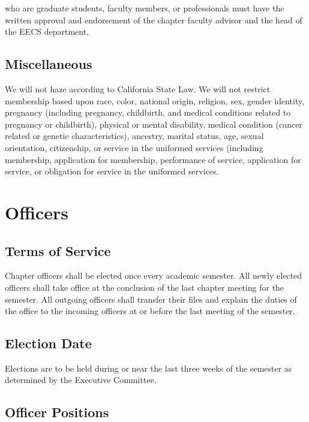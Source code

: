 \documentclass[11pt]{article}
\begin{document}
who are graduate students, faculty members, or professionals must have the written approval and endorsement of the chapter faculty advisor and the head of the EECS department.

\subsection{Miscellaneous}
\label{sec:orgf3400cb}

We will not haze according to California State Law.
We will not restrict membership based upon race, color, national origin, religion, sex, gender identity, pregnancy (including pregnancy, childbirth, and medical conditions related to pregnancy or childbirth), physical or mental disability, medical condition (cancer related or genetic characteristics), ancestry, marital status, age, sexual orientation, citizenship, or service in the uniformed services (including membership, application for membership, performance of service, application for service, or obligation for service in the uniformed services.
\section{Officers}
\label{sec:org9693f40}

\subsection{Terms of Service}
\label{sec:org7ea95d2}

Chapter officers shall be elected once every academic semester.
All newly elected officers shall take office at the conclusion of the last chapter meeting for the semester.
All outgoing officers shall transfer their files and explain the duties of the office to the incoming officers at or before the last meeting of the semester.

\subsection{Election Date}
\label{sec:org8902631}

Elections are to be held during or near the last three weeks of the semester as determined by the Executive Committee.

\subsection{Officer Positions}
\label{sec:org51b501d}
\end{document}
